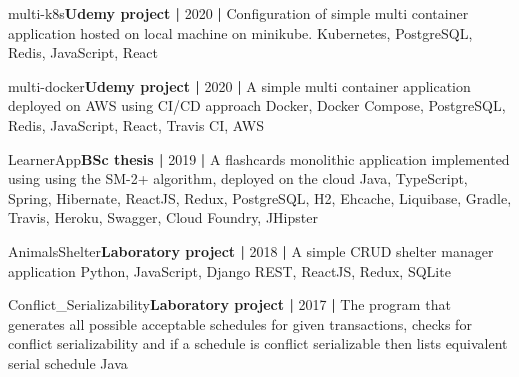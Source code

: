 
\begin{projects}

	\project
	{multi-k8s}{\textbf{Udemy project |} 2020 \textbf{|}}
	{}
	{Configuration of simple multi container application hosted on local machine on minikube.}
	{Kubernetes, PostgreSQL, Redis, JavaScript, React}
	
	\project
	{multi-docker}{\textbf{Udemy project |} 2020 \textbf{|}}
	{}
	{A simple multi container application deployed on AWS using CI/CD approach }
	{Docker, Docker Compose, PostgreSQL, Redis, JavaScript, React, Travis CI, AWS}
	
	\project
	{LearnerApp}{\textbf{BSc thesis |} 2019 \textbf{|}}
	{}
	{A flashcards monolithic application implemented using using the SM-2+ algorithm, deployed on the cloud}
	{Java, TypeScript, Spring, Hibernate, ReactJS, Redux, PostgreSQL, H2, Ehcache, Liquibase, Gradle, Travis, Heroku, Swagger, Cloud Foundry, JHipster}	
	
	\project
	{AnimalsShelter}{\textbf{Laboratory project |} 2018 \textbf{|}}
	{}
	{A simple CRUD shelter manager application}
	{Python, JavaScript, Django REST, ReactJS, Redux, SQLite}
	
	\project
	{Conflict\_Serializability}{\textbf{Laboratory project |} 2017 \textbf{|}}
	{}
	{The program that generates all possible acceptable schedules for given transactions, checks for conflict serializability and if a schedule is conflict serializable then lists equivalent serial schedule}
	{Java}
\end{projects}
